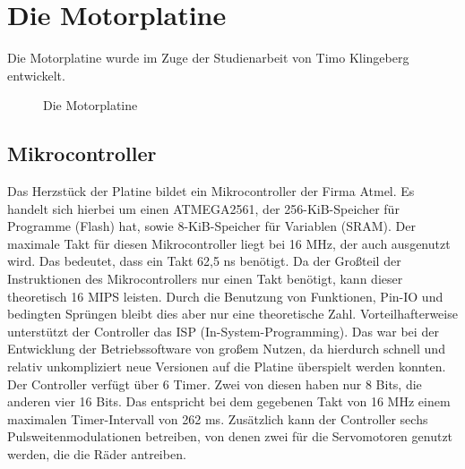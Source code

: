 \section{Die Motorplatine}
Die Motorplatine wurde im Zuge der Studienarbeit von Timo Klingeberg \cite{STUD_TIMO}
entwickelt.
\begin{figure}[htb]
 \centering
 \caption{\label{board}Die Motorplatine}
\end{figure}
\subsection{Mikrocontroller}
Das Herzstück der Platine bildet ein Mikrocontroller der Firma Atmel.
Es handelt sich hierbei um einen ATMEGA2561\cite{ATMEGA_MANUAL}, der 256-KiB-Speicher für
Programme (Flash) hat, sowie 8-KiB-Speicher für Variablen (SRAM). Der maximale Takt für
diesen Mikrocontroller liegt bei 16 MHz, der auch ausgenutzt wird. Das bedeutet, dass
ein Takt 62,5 ns benötigt. Da der Großteil der Instruktionen des Mikrocontrollers nur
einen Takt benötigt, kann dieser theoretisch 16 MIPS leisten. Durch die Benutzung
von Funktionen, Pin-IO und bedingten Sprüngen bleibt dies aber nur eine theoretische Zahl.
Vorteilhafterweise unterstützt der Controller das ISP (In-System-Programming). Das war bei der
Entwicklung der Betriebssoftware von großem Nutzen, da hierdurch schnell und relativ
unkompliziert neue Versionen auf die Platine überspielt werden konnten.\\
Der Controller verfügt über 6 Timer. Zwei von diesen haben nur 8 Bits, die anderen vier
16 Bits. Das entspricht bei dem gegebenen Takt von 16 MHz einem maximalen Timer-Intervall von 262 ms.
Zusätzlich kann der Controller sechs Pulsweitenmodulationen betreiben, von
denen zwei für die Servomotoren genutzt werden, die die Räder antreiben.
